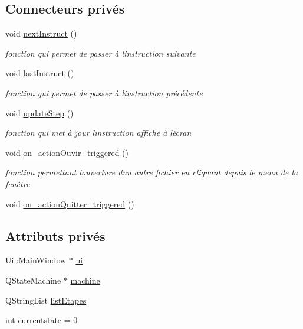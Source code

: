 \subsection*{Connecteurs privés}
\begin{DoxyCompactItemize}
\item 
void \hyperlink{classMainWindow_a0b79b7ea071fc3a4baa45f8394052ffd}{next\+Instruct} ()
\begin{DoxyCompactList}\small\item\em fonction qui permet de passer à l\textquotesingle{}instruction suivante \end{DoxyCompactList}\item 
void \hyperlink{classMainWindow_a715f753a6c46e3f10565a5a1b849ee86}{last\+Instruct} ()
\begin{DoxyCompactList}\small\item\em fonction qui permet de passer à l\textquotesingle{}instruction précédente \end{DoxyCompactList}\item 
void \hyperlink{classMainWindow_a344d21527850380c306fe7ac165321bd}{update\+Step} ()
\begin{DoxyCompactList}\small\item\em fonction qui met à jour l\textquotesingle{}instruction affiché à l\textquotesingle{}écran \end{DoxyCompactList}\item 
void \hyperlink{classMainWindow_aacde03c39958646fddec981b89d37238}{on\+\_\+action\+Ouvir\+\_\+triggered} ()
\begin{DoxyCompactList}\small\item\em fonction permettant l\textquotesingle{}ouverture d\textquotesingle{}un autre fichier en cliquant depuis le menu de la fenêtre \end{DoxyCompactList}\item 
void \hyperlink{classMainWindow_afe9d9d46e61e2460e636619577a9e8fd}{on\+\_\+action\+Quitter\+\_\+triggered} ()
\end{DoxyCompactItemize}
\subsection*{Attributs privés}
\begin{DoxyCompactItemize}
\item 
Ui\+::\+Main\+Window $\ast$ \hyperlink{classMainWindow_a35466a70ed47252a0191168126a352a5}{ui}
\item 
Q\+State\+Machine $\ast$ \hyperlink{classMainWindow_af5f0afb6c5f81e4438f98f93f918ea8b}{machine}
\item 
Q\+String\+List \hyperlink{classMainWindow_a1290f4c9df65fb27c870753aa2b24a88}{list\+Etapes}
\item 
int \hyperlink{classMainWindow_aa7fb75eed49d7eaa019f64577fa11b05}{currentstate} = 0
\end{DoxyCompactItemize}


